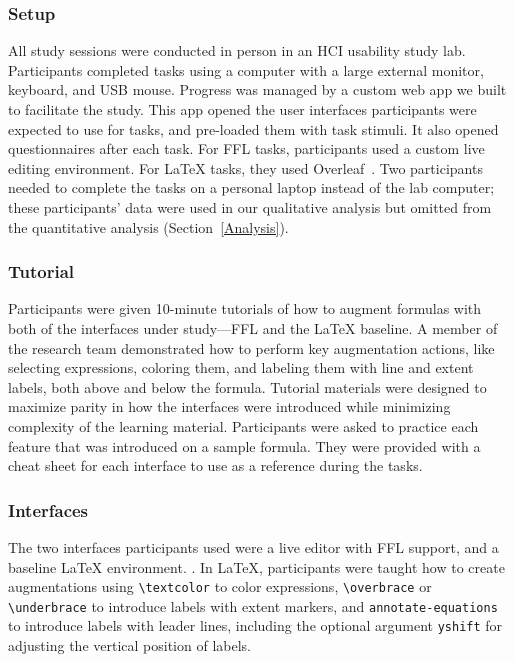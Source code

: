 \subsubsection{Setup}
All study sessions were conducted in person in an HCI usability study lab. Participants completed tasks using a computer with a large external monitor, keyboard, and USB mouse. Progress was managed by a custom web app we built to facilitate the study. This app opened the user interfaces participants were expected to use for tasks, and pre-loaded them with task stimuli. It also opened questionnaires after each task. For FFL tasks, participants used a custom live editing environment. For LaTeX tasks, they used Overleaf~\cite{tool:overleaf}. Two participants needed to complete the tasks on a personal laptop instead of the lab computer; these participants' data were used in our qualitative analysis but omitted from the quantitative analysis (Section~\ref{Analysis}).

\subsubsection{Tutorial}
Participants were given 10-minute tutorials of how to augment formulas with both of the interfaces under study---FFL and the LaTeX baseline. A member of the research team demonstrated how to perform key augmentation actions, like selecting expressions, coloring them, and labeling them with line and extent labels, both above and below the formula. Tutorial materials were designed to maximize parity in how the interfaces were introduced while minimizing complexity of the learning material. Participants were asked to practice each feature that was introduced on a sample formula. They were provided with a cheat sheet for each interface to use as a reference during the tasks.

\subsubsection{Interfaces}
The two interfaces participants used were a live editor with FFL support, and a baseline LaTeX environment. . In LaTeX, participants were taught how to create augmentations using \texttt{\textbackslash textcolor} to color expressions, \texttt{\textbackslash overbrace} or \texttt{\textbackslash underbrace} to introduce labels with extent markers, and \texttt{annotate-equations}~\cite{tool:annotateequations} to introduce labels with leader lines, including the optional argument \texttt{yshift} for adjusting the vertical position of labels.

